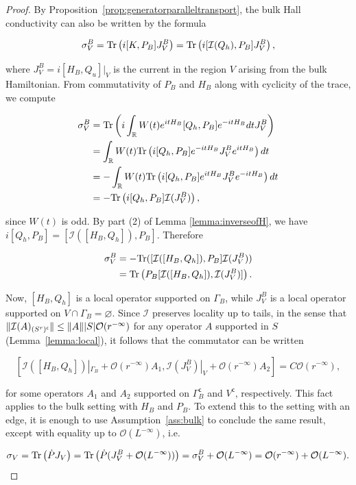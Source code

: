 \documentclass[12pt, letterpaper]{article}
\begin{document}
\begin{proof}
By Proposition~\ref{prop:generatorparalleltransport}, the bulk Hall conductivity can also be written by the formula 

\[\sigma_V^B = \text{Tr}\left(i[K,P_B]J_V^B\right) = \text{Tr}\left(i[\mathcal{I}(Q_h), P_B]J_V^B\right),\]

where $J_V^B = i[H_B, Q_u]|_V$ is the current in the region $V$ arising from the bulk Hamiltonian. From commutativity of $P_B$ and $H_B$ along with cyclicity of the trace, we compute

\[\begin{aligned}
\sigma_V^B &= \text{Tr}\left(i\int_{\mathbb{R}} W(t) e^{itH_B} [Q_h,P_B] e^{-itH_B}dt J_V^B \right)\\
&= \int_{\mathbb{R}} W(t) \text{Tr}\left(i[Q_h,P_B] e^{-itH_B}J_V^Be^{itH_B}\right)dt\\
&= -\int_{\mathbb{R}} W(t) \text{Tr}\left(i[Q_h,P_B] e^{itH_B}J_V^Be^{-itH_B}\right)dt\\
&=- \text{Tr}\left(i[Q_h,P_B]\mathcal{I}(J_V^B)\right),
\end{aligned}\]

since $W(t)$ is odd. By part (2) of Lemma \ref{lemma:inverseofH}, we have $i[Q_h,P_B] = [\mathcal{I}([H_B,Q_h]),P_B]$. Therefore

\[\begin{aligned}
\sigma_V^B &=-\text{Tr}([\mathcal{I}([H_B,Q_h]), P_B]\mathcal{I}(J_V^B))\\
&= \text{Tr}\left( P_B[\mathcal{I}([H_B,Q_h]), \mathcal{I}(J_V^B)]\right).
\end{aligned}\]

Now, $[H_B, Q_h]$ is a local operator supported on $\Gamma_B$, while $J_V^B$ is a local operator supported on $V \cap \Gamma_B = \varnothing$. Since $\mathcal{I}$ preserves locality up to tails, in the sense that $\lVert \mathcal{I}(A)_{(S^r)^\mathsf{c}} \rVert \leq \lVert A \rVert |S| \mathcal{O}(r^{-\infty})$ for any operator $A$ supported in $S$ (Lemma~\ref{lemma:local}), it follows that the commutator can be written

\[[\mathcal{I}([H_B,Q_h])|_{\Gamma_B} + \mathcal{O}(r^{-\infty}) A_1, \mathcal{I}(J_V^B)|_V + \mathcal{O}(r^{-\infty}) A_2] = C\mathcal{O}(r^{-\infty}),\]

for some operators $A_1$ and $A_2$ supported on $\Gamma_B^\mathsf{c}$ and $V^\mathsf{c}$, respectively. This fact applies to the bulk setting with $H_B$ and $P_B$. To extend this to the setting with an edge, it is enough to use Assumption~\ref{ass:bulk} to conclude the same result, except with equality up to $\mathcal{O}(L^{-\infty})$, i.e.

\[\sigma_V = \text{Tr}\left(\dot{P}J_V\right) = \text{Tr}\left(\dot{P}(J_V^B + \mathcal{O}(L^{-\infty}))\right) = \sigma_V^B + \mathcal{O}(L^{-\infty}) = \mathcal{O}(r^{-\infty}) + \mathcal{O}(L^{-\infty}).\]

\end{proof}
\end{document}

